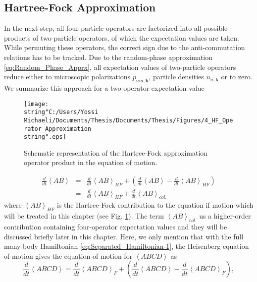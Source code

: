 \subsection{Hartree-Fock Approximation}

In the next step, all four-particle operators are factorized into
all possible products of two-particle operators, of which the expectation
values are taken. While permuting these operators, the correct sign
due to the anti-commutation relations has to be tracked. Due to the
random-phase approximation \ref{eq:Random_Phase_Apprx}, all expectation
values of two-particle operators reduce either to microscopic polarizations
$p_{nm,\mathbf{k}}$, particle densities $n_{n,\mathbf{k}}$ or to
zero. We summarize this approach for a two-operator expectation value%
\begin{figure}
\begin{centering}
\texttt{[image: \\string"C:/Users/Yossi Michaeli/Documents/Thesis/Documents/Thesis/Figures/4\_HF\_Operator\_Approximation\\string".eps]}
\par\end{centering}

\caption{\label{fig:Schematic_HF_Operator_Approximation}Schematic representation
of the Hartree-Fock approximation operator product in the equation
of motion.}



\end{figure}
 \begin{eqnarray}
\frac{d}{dt}\left\langle AB\right\rangle  & = & \frac{d}{dt}\left\langle AB\right\rangle _{HF}+\left(\frac{d}{dt}\left\langle AB\right\rangle -\frac{d}{dt}\left\langle AB\right\rangle _{HF}\right)\nonumber \\
 & = & \frac{d}{dt}\left\langle AB\right\rangle _{HF}+\frac{d}{dt}\left\langle AB\right\rangle _{col.}\end{eqnarray}
where $\left\langle AB\right\rangle _{HF}$ is the Hartree-Fock contribution
to the equation if motion which will be treated in this chapter (see
Fig. \ref{fig:Schematic_HF_Operator_Approximation}). The term $\left\langle AB\right\rangle _{col.}$
us a higher-order contribution containing four-operator expectation
values and they will be discussed briefly later in this chapter. Here,
we only mention that with the full many-body Hamiltonian \ref{eq:Separated_Hamiltonian-1},
the Heisenberg equation of motion gives the equation of motion for
$\left\langle ABCD\right\rangle $ as \begin{equation}
\frac{d}{dt}\left\langle ABCD\right\rangle =\frac{d}{dt}\left\langle ABCD\right\rangle _{F}+\left(\frac{d}{dt}\left\langle ABCD\right\rangle -\frac{d}{dt}\left\langle ABCD\right\rangle _{F}\right),\end{equation}
